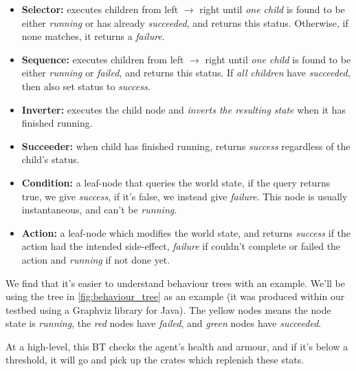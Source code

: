 \documentclass[a4paper, twocolumn]{article}
\begin{document}
        \begin{itemize}
            \item{\textbf{Selector:} executes children from left \(\rightarrow\) right until \emph{one child} is found to be either \emph{running} or has already \emph{succeeded}, and returns this status. Otherwise, if none matches, it returns a \emph{failure}.}
            \item{\textbf{Sequence:} executes children from left \(\rightarrow\) right until \emph{one child} is found to be either \emph{running} or \emph{failed}, and returns this status. If \emph{all children} have \emph{succeeded}, then also set status to \emph{success}.}
            \item{\textbf{Inverter:} executes the child node and \emph{inverts the resulting state} when it has finished running.}
            \item{\textbf{Succeeder:} when child has finished running, returns \emph{success} regardless of the child's status.}
            \item{\textbf{Condition:} a leaf-node that queries the world state, if the query returns true, we give \emph{success}, if it's false, we instead give \emph{failure}. This node is usually instantaneous, and can't be \emph{running}.}
            \item{\textbf{Action:} a leaf-node which modifies the world state, and returns \emph{success} if the action had the intended side-effect, \emph{failure} if couldn't complete or failed the action and \emph{running} if not done yet.}

        \end{itemize}

        We find that it's easier to understand behaviour trees with an example. We'll be using the tree in \cref{fig:behaviour_tree} as an example (it was produced within our testbed using a Graphviz library for Java). The yellow nodes means the node state is \emph{running}, the \emph{red} nodes have \emph{failed}, and \emph{green} nodes have \emph{succeeded}.

        At a high-level, this BT checks the agent's health and armour, and if it's below a threshold, it will go and pick up the crates which replenish these stats.
\end{document}

